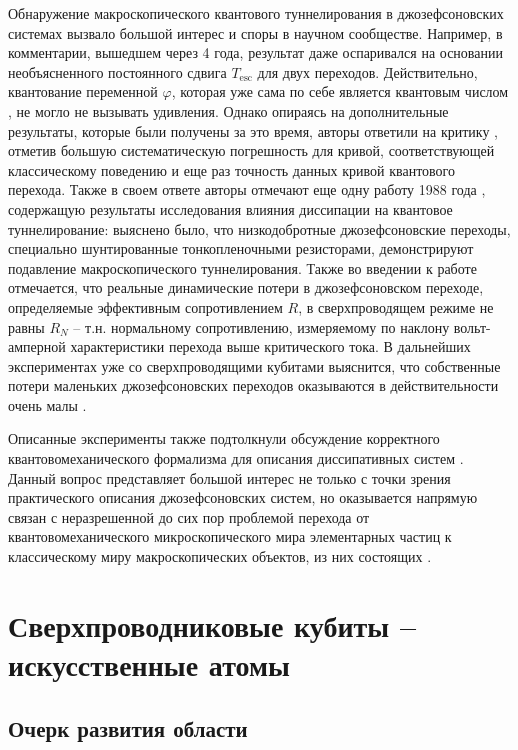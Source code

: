 \documentclass[14pt, a4paper]{extreport}
\numberwithin{equation}{section}
\begin{document}
Обнаружение макроскопического квантового туннелирования в джозефсоновских системах вызвало большой интерес и споры в научном сообществе. Например, в комментарии, вышедшем через 4 года\cite{silvestrini1989comment}, результат даже оспаривался на основании необъясненного постоянного сдвига $T_\text{esc}$ для двух переходов. Действительно, квантование переменной $\varphi$, которая уже сама по себе является квантовым числом \cite{ambegaokar1963tunneling}, не могло не вызывать удивления. Однако опираясь на дополнительные результаты, которые были получены за это время, авторы ответили на критику \cite{devoret1989devoret}, отметив большую систематическую погрешность для кривой, соответствующей классическому поведению и еще раз точность данных кривой квантового перехода. Также в своем ответе авторы отмечают еще одну работу 1988 года \cite{cleland1988measurement}, содержащую результаты исследования влияния диссипации на квантовое туннелирование: выяснено было, что низкодобротные джозефсоновские переходы, специально шунтированные тонкопленочными резисторами, демонстрируют подавление макроскопического туннелирования. Также во введении к работе отмечается, что реальные динамические потери в джозефсоновском переходе, определяемые эффективным сопротивлением $R$, в сверхпроводящем режиме не  равны $R_N$ -- т.н. нормальному сопротивлению, измеряемому по наклону вольт-амперной характеристики перехода выше критического тока. В дальнейших экспериментах уже со сверхпроводящими кубитами выяснится, что собственные потери маленьких джозефсоновских переходов оказываются в действительности очень малы \cite{paik2011observation}.

Описанные эксперименты также подтолкнули обсуждение корректного квантовомеханического формализма для описания диссипативных систем \cite{caldeira1985influence, walls1985effect}. Данный вопрос представляет большой интерес не только с точки зрения практического описания джозефсоновских систем, но оказывается напрямую связан с неразрешенной до сих пор проблемой перехода от квантовомеханического микроскопического мира элементарных частиц к классическому миру макроскопических объектов, из них состоящих \cite{walls1985analysis, zurek2009quantum}.



\section{Сверхпроводниковые кубиты -- искусственные атомы}

\subsection{Очерк развития области}
\end{document}
